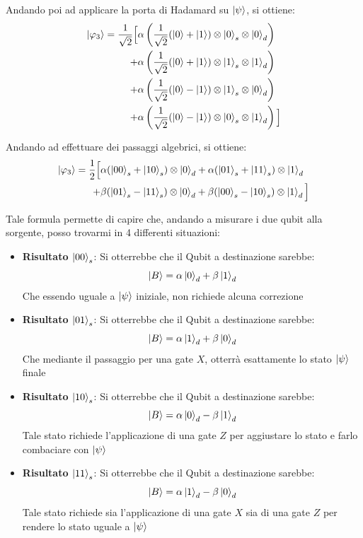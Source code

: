 Andando poi ad applicare la porta di Hadamard su \(\ket{\psi}\), si ottiene:
\begin{equation*}
\begin{aligned}
\ket{\varphi_3} = \frac{1}{\sqrt{2}}\Big[
& \alpha \left(\frac{1}{\sqrt{2}}(\ket{0} + \ket{1}) \otimes \ket{0}_s \otimes \ket{0}_d\right) \\
+ & \alpha \left(\frac{1}{\sqrt{2}}(\ket{0} + \ket{1}) \otimes \ket{1}_s \otimes \ket{1}_d\right) \\
+ & \alpha \left(\frac{1}{\sqrt{2}}(\ket{0} - \ket{1}) \otimes \ket{1}_s \otimes \ket{0}_d\right) \\
+ & \alpha \left(\frac{1}{\sqrt{2}}(\ket{0} - \ket{1}) \otimes \ket{0}_s \otimes \ket{1}_d\right)
\Big]
\end{aligned}
\end{equation*}

Andando ad effettuare dei passaggi algebrici, si ottiene:
\begin{equation*}
\begin{aligned}
\ket{\varphi_3} = \frac{1}{2} \Big[
& \alpha (\ket{00}_s + \ket{10}_s) \otimes \ket{0}_d + \alpha (\ket{01}_s + \ket{11}_s) \otimes \ket{1}_d \\
+ & \beta (\ket{01}_s - \ket{11}_s) \otimes \ket{0}_d + \beta (\ket{00}_s - \ket{10}_s) \otimes \ket{1}_d
\Big]
\end{aligned}
\end{equation*}

Tale formula permette di capire che, andando a misurare i due qubit alla sorgente, posso trovarmi in 4 differenti situazioni:
\begin{itemize}
    \item \textbf{Risultato \(\ket{00}_s\)}: Si otterrebbe che il Qubit a destinazione sarebbe:
    \[
    \ket{B} = \alpha \ket{0}_d + \beta \ket{1}_d
    \]
    Che essendo uguale a \(\ket{\psi}\) iniziale, non richiede alcuna correzione

    \item \textbf{Risultato \(\ket{01}_s\)}: Si otterrebbe che il Qubit a destinazione sarebbe:
    \[
    \ket{B} = \alpha \ket{1}_d + \beta \ket{0}_d
    \]
    Che mediante il passaggio per una gate \(X\), otterrà esattamente lo stato \(\ket{\psi}\) finale
    
    \item \textbf{Risultato \(\ket{10}_s\)}: Si otterrebbe che il Qubit a destinazione sarebbe:
    \[
    \ket{B} = \alpha \ket{0}_d - \beta \ket{1}_d
    \]
    Tale stato richiede l'applicazione di una gate \(Z\) per aggiustare lo stato e farlo combaciare con \(\ket{\psi}\)

    \item \textbf{Risultato \(\ket{11}_s\)}: Si otterrebbe che il Qubit a destinazione sarebbe:
    \[
    \ket{B} = \alpha \ket{1}_d - \beta \ket{0}_d
    \]
    Tale stato richiede sia l'applicazione di una gate \(X\) sia di una gate \(Z\) per rendere lo stato uguale a \(\ket{\psi}\)
\end{itemize}

